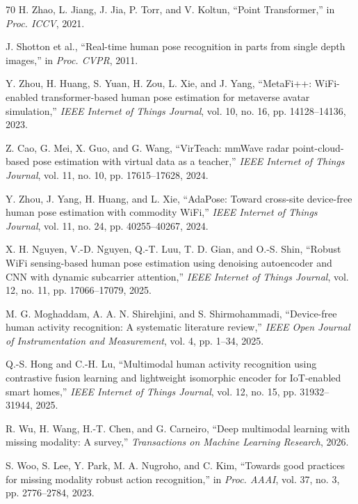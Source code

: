 \documentclass[journal]{IEEEtran}
\begin{document}
\begin{thebibliography}{70}
H. Zhao, L. Jiang, J. Jia, P. Torr, and V. Koltun, ``Point Transformer,'' in \emph{Proc. ICCV}, 2021.

J. Shotton et al., ``Real-time human pose recognition in parts from single depth images,'' in \emph{Proc. CVPR}, 2011.

Y. Zhou, H. Huang, S. Yuan, H. Zou, L. Xie, and J. Yang, ``MetaFi++: WiFi-enabled transformer-based human pose estimation for metaverse avatar simulation,'' \emph{IEEE Internet of Things Journal}, vol. 10, no. 16, pp. 14128--14136, 2023.

Z. Cao, G. Mei, X. Guo, and G. Wang, ``VirTeach: mmWave radar point-cloud-based pose estimation with virtual data as a teacher,'' \emph{IEEE Internet of Things Journal}, vol. 11, no. 10, pp. 17615--17628, 2024.

Y. Zhou, J. Yang, H. Huang, and L. Xie, ``AdaPose: Toward cross-site device-free human pose estimation with commodity WiFi,'' \emph{IEEE Internet of Things Journal}, vol. 11, no. 24, pp. 40255--40267, 2024.

X. H. Nguyen, V.-D. Nguyen, Q.-T. Luu, T. D. Gian, and O.-S. Shin, ``Robust WiFi sensing-based human pose estimation using denoising autoencoder and CNN with dynamic subcarrier attention,'' \emph{IEEE Internet of Things Journal}, vol. 12, no. 11, pp. 17066--17079, 2025.

M. G. Moghaddam, A. A. N. Shirehjini, and S. Shirmohammadi, ``Device-free human activity recognition: A systematic literature review,'' \emph{IEEE Open Journal of Instrumentation and Measurement}, vol. 4, pp. 1--34, 2025.

Q.-S. Hong and C.-H. Lu, ``Multimodal human activity recognition using contrastive fusion learning and lightweight isomorphic encoder for IoT-enabled smart homes,'' \emph{IEEE Internet of Things Journal}, vol. 12, no. 15, pp. 31932--31944, 2025.

R. Wu, H. Wang, H.-T. Chen, and G. Carneiro, ``Deep multimodal learning with missing modality: A survey,'' \emph{Transactions on Machine Learning Research}, 2026.

S. Woo, S. Lee, Y. Park, M. A. Nugroho, and C. Kim, ``Towards good practices for missing modality robust action recognition,'' in \emph{Proc. AAAI}, vol. 37, no. 3, pp. 2776--2784, 2023.


\end{thebibliography}
\end{document}

